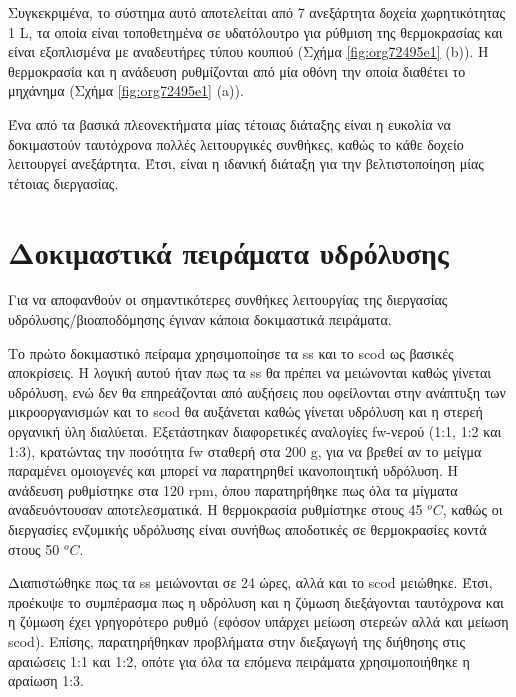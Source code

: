 \documentclass[11pt]{report}
\begin{document}
Συγκεκριμένα, το σύστημα αυτό αποτελείται από 7 ανεξάρτητα δοχεία χωρητικότητας 1 L, τα οποία είναι τοποθετημένα σε υδατόλουτρο για ρύθμιση της θερμοκρασίας και είναι εξοπλισμένα με αναδευτήρες τύπου κουπιού (Σχήμα \ref{fig:org72495e1} (b)). Η θερμοκρασία και η ανάδευση ρυθμίζονται από μία οθόνη την οποία διαθέτει το μηχάνημα (Σχήμα \ref{fig:org72495e1} (a)). 

Ένα από τα βασικά πλεονεκτήματα μίας τέτοιας διάταξης είναι η ευκολία να δοκιμαστούν ταυτόχρονα πολλές λειτουργικές συνθήκες, καθώς το κάθε δοχείο λειτουργεί ανεξάρτητα. Έτσι, είναι η ιδανική διάταξη για την βελτιστοποίηση μίας τέτοιας διεργασίας.

\section{Δοκιμαστικά πειράματα υδρόλυσης}
\label{sec:org85353cb}
\label{sec:prep-hydro}

Για να αποφανθούν οι σημαντικότερες συνθήκες λειτουργίας της διεργασίας υδρόλυσης/βιοαποδόμησης έγιναν κάποια δοκιμαστικά πειράματα.

Το πρώτο δοκιμαστικό πείραμα χρησιμοποίησε τα \acrfull{ss} και το \acrfull{scod} ως βασικές αποκρίσεις. Η λογική αυτού ήταν πως τα \acrshort{ss} θα πρέπει να μειώνονται καθώς γίνεται υδρόλυση, ενώ δεν θα επηρεάζονται από αυξήσεις που οφείλονται στην ανάπτυξη των μικροοργανισμών και το \acrshort{scod} θα αυξάνεται καθώς γίνεται υδρόλυση και η στερεή οργανική ύλη διαλύεται. Εξετάστηκαν διαφορετικές αναλογίες \acrshort{fw}-νερού (1:1, 1:2 και 1:3), κρατώντας την ποσότητα \acrshort{fw} σταθερή στα 200 g, για να βρεθεί αν το μείγμα παραμένει ομοιογενές και μπορεί να παρατηρηθεί ικανοποιητική υδρόλυση. Η ανάδευση ρυθμίστηκε στα 120 rpm, όπου παρατηρήθηκε πως όλα τα μίγματα αναδευόντουσαν αποτελεσματικά. Η θερμοκρασία ρυθμίστηκε στους 45 \(^oC\), καθώς οι διεργασίες ενζυμικής υδρόλυσης είναι συνήθως αποδοτικές σε θερμοκρασίες κοντά στους 50 \(^oC\). 

Διαπιστώθηκε πως τα \acrfull{ss} μειώνονται σε 24 ώρες, αλλά και το \acrshort{scod} μειώθηκε. Έτσι, προέκυψε το συμπέρασμα πως η υδρόλυση και η ζύμωση διεξάγονται ταυτόχρονα και η ζύμωση έχει γρηγορότερο ρυθμό (εφόσον υπάρχει μείωση στερεών αλλά και μείωση \acrshort{scod}). Επίσης, παρατηρήθηκαν προβλήματα στην διεξαγωγή της διήθησης στις αραιώσεις 1:1 και 1:2, οπότε για όλα τα επόμενα πειράματα χρησιμοποιήθηκε η αραίωση 1:3.
\end{document}
